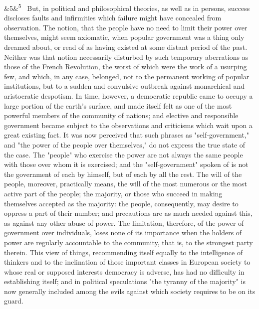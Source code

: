 \documentclass[12pt]{article}
\newcommand{\para}[1][]{\par\noindent\ifx&#1&\else\textsuperscript{\footnotesize #1}~\fi}
\begin{document}
\para[5] But, in political and philosophical theories, as well as in persons, success discloses faults and infirmities which failure might have concealed from observation. The notion, that the people have no need to limit their power over themselves, might seem axiomatic, when popular government was a thing only dreamed about, or read of as having existed at some distant period of the past. Neither was that notion necessarily disturbed by such temporary aberrations as those of the French Revolution, the worst of which were the work of a usurping few, and which, in any case, belonged, not to the permanent working of popular institutions, but to a sudden and convulsive outbreak against monarchical and aristocratic despotism. In time, however, a democratic republic came to occupy a large portion of the earth's surface, and made itself felt as one of the most powerful members of the community of nations; and elective and responsible government became subject to the observations and criticisms which wait upon a great existing fact. It was now perceived that such phrases as "self-government," and "the power of the people over themselves," do not express the true state of the case. The "people" who exercise the power are not always the same people with those over whom it is exercised; and the "self-government" spoken of is not the government of each by himself, but of each by all the rest. The will of the people, moreover, practically means, the will of the most numerous or the most active part of the people; the majority, or those who succeed in making themselves accepted as the majority: the people, consequently, may desire to oppress a part of their number; and precautions are as much needed against this, as against any other abuse of power. The limitation, therefore, of the power of government over individuals, loses none of its importance when the holders of power are regularly accountable to the community, that is, to the strongest party therein. This view of things, recommending itself equally to the intelligence of thinkers and to the inclination of those important classes in European society to whose real or supposed interests democracy is adverse, has had no difficulty in establishing itself; and in political speculations "the tyranny of the majority" is now generally included among the evils against which society requires to be on its guard.
\end{document}
